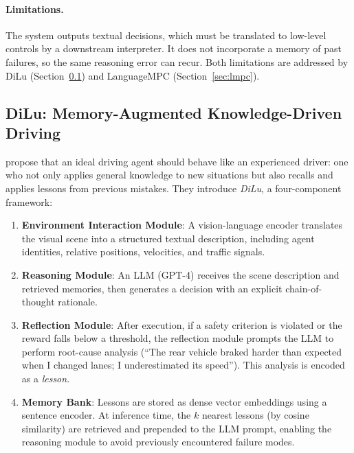 \documentclass[12pt, a4paper]{article}
\begin{document}
\paragraph{Limitations.}
The system outputs textual decisions, which must be translated to low-level
controls by a downstream interpreter. It does not incorporate a memory of past
failures, so the same reasoning error can recur. Both limitations are addressed by
DiLu (Section~\ref{sec:dilu}) and LanguageMPC (Section~\ref{sec:lmpc}).

\subsection{DiLu: Memory-Augmented Knowledge-Driven Driving}
\label{sec:dilu}

\citet{wen2023dilu} propose that an ideal driving agent should behave like an
experienced driver: one who not only applies general knowledge to new situations
but also recalls and applies lessons from previous mistakes. They introduce
\emph{DiLu}, a four-component framework:

\begin{enumerate}
  \item \textbf{Environment Interaction Module}: A vision-language encoder
        translates the visual scene into a structured textual description, including
        agent identities, relative positions, velocities, and traffic signals.

  \item \textbf{Reasoning Module}: An LLM (GPT-4) receives the scene description
        and retrieved memories, then generates a decision with an explicit
        chain-of-thought rationale.

  \item \textbf{Reflection Module}: After execution, if a safety criterion is
        violated or the reward falls below a threshold, the reflection module
        prompts the LLM to perform root-cause analysis (``The rear vehicle braked
        harder than expected when I changed lanes; I underestimated its speed'').
        This analysis is encoded as a \emph{lesson}.

  \item \textbf{Memory Bank}: Lessons are stored as dense vector embeddings using
        a sentence encoder. At inference time, the $k$ nearest lessons (by cosine
        similarity) are retrieved and prepended to the LLM prompt, enabling the
        reasoning module to avoid previously encountered failure modes.
\end{enumerate}
\end{document}
